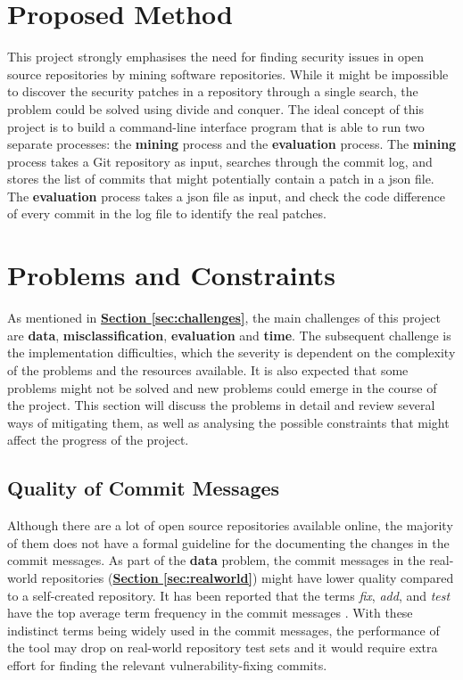 \documentclass[12pt, a4paper]{report}
\begin{document}
\section{Proposed Method}
This project strongly emphasises the need for finding security issues in open source repositories by
mining software repositories. While it might be impossible to discover the security patches in a
repository through a single search, the problem could be solved using divide and conquer. The ideal
concept of this project is to build a command-line interface program that is able to run two
separate processes: the \textbf{mining} process and the \textbf{evaluation} process. The
\textbf{mining} process takes a Git repository as input, searches through the commit log, and stores
the list of commits that might potentially contain a patch in a \acrshort{json} file. The
\textbf{evaluation} process takes a \acrshort{json} file as input, and check the code difference of
every commit in the log file to identify the real patches.

\section{Problems and Constraints} \label{sec:problems_and_constraints}
As mentioned in \hyperref[sec:challenges]{\textbf{Section \ref*{sec:challenges}}}, the main
challenges of this project are \textbf{data}, \textbf{misclassification}, \textbf{evaluation} and
\textbf{time}. The subsequent challenge is the implementation difficulties, which the severity is
dependent on the complexity of the problems and the resources available. It is also expected that
some problems might not be solved and new problems could emerge in the course of the project. This
section will discuss the problems in detail and review several ways of mitigating them, as well as
analysing the possible constraints that might affect the progress of the project.

\subsection{Quality of Commit Messages} \label{subsec:commit_quality}
Although there are a lot of open source repositories available online, the majority of them does not
have a formal guideline for the documenting the changes in the commit messages. As part of the
\textbf{data} problem, the commit messages in the real-world repositories
(\hyperref[sec:realworld]{\textbf{Section \ref*{sec:realworld}}}) might have lower quality compared
to a self-created repository. It has been reported that the terms \textit{fix}, \textit{add}, and
\textit{test} have the top average term frequency in the commit messages \cite{alali_2008}. With
these indistinct terms being widely used in the commit messages, the performance of the tool may
drop on real-world repository test sets and it would require extra effort for finding the relevant
vulnerability-fixing commits.
\end{document}
